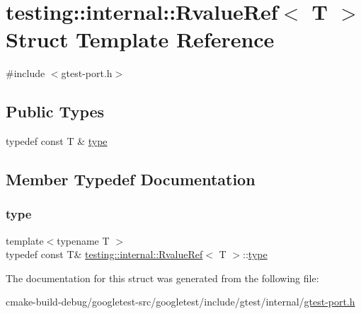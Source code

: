 \hypertarget{structtesting_1_1internal_1_1RvalueRef}{}\section{testing\+::internal\+::Rvalue\+Ref$<$ T $>$ Struct Template Reference}
\label{structtesting_1_1internal_1_1RvalueRef}


{\ttfamily \#include $<$gtest-\/port.\+h$>$}

\subsection*{Public Types}
\begin{DoxyCompactItemize}
\item 
typedef const T \& \mbox{\hyperlink{structtesting_1_1internal_1_1RvalueRef_ad09f1fbc87569c7e2837274193097e44}{type}}
\end{DoxyCompactItemize}


\subsection{Member Typedef Documentation}
\mbox{\label{structtesting_1_1internal_1_1RvalueRef_ad09f1fbc87569c7e2837274193097e44}} 
\subsubsection{\texorpdfstring{type}{type}}
{\footnotesize\ttfamily template$<$typename T $>$ \\
typedef const T\& \mbox{\hyperlink{structtesting_1_1internal_1_1RvalueRef}{testing\+::internal\+::\+Rvalue\+Ref}}$<$ T $>$\+::\mbox{\hyperlink{structtesting_1_1internal_1_1RvalueRef_ad09f1fbc87569c7e2837274193097e44}{type}}}



The documentation for this struct was generated from the following file\+:\begin{DoxyCompactItemize}
\item 
cmake-\/build-\/debug/googletest-\/src/googletest/include/gtest/internal/\mbox{\hyperlink{gtest-port_8h}{gtest-\/port.\+h}}\end{DoxyCompactItemize}

